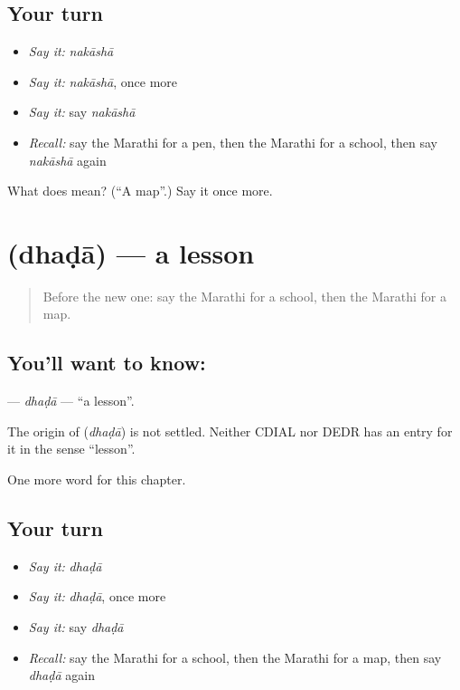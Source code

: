 \subsection*{Your turn}
\begin{itemize}
\raggedright
  \item \emph{Say it:} \emph{nakāshā}
  \item \emph{Say it:} \emph{nakāshā}, once more
  \item \emph{Say it:} say \emph{nakāshā}
  \item \emph{Recall:} say the Marathi for a pen, then the Marathi for a school, then say \emph{nakāshā} again
\end{itemize}

\begin{tcolorbox}[breakable,colback=teal!4,colframe=teal!35!black,title={Before you move on}]
What does  mean? (\textquotedblleft{}A map\textquotedblright{}.) Say it once more.
\end{tcolorbox}
\section[\texorpdfstring{\mr{धडा} (dhaḍā)}{धडा (dhaḍā)}]{ (dhaḍā) — a lesson}

\label{lesson:MR-C94-dhada}



\begin{quote}
Before the new one: say the Marathi for a school, then the Marathi for a map.
\end{quote}

\subsection*{You'll want to know: }
\textbf{} — \emph{dhaḍā} — \textquotedblleft{}a lesson\textquotedblright{}.

\begin{cousinweb}
The origin of \textbf{} (\emph{dhaḍā}) is not settled. Neither CDIAL nor DEDR has an entry for it in the sense \textquotedblleft{}lesson\textquotedblright{}.
\end{cousinweb}

\begin{grammarlens}[title={What you've built}]
One more word for this chapter.
\end{grammarlens}

\subsection*{Your turn}
\begin{itemize}
\raggedright
  \item \emph{Say it:} \emph{dhaḍā}
  \item \emph{Say it:} \emph{dhaḍā}, once more
  \item \emph{Say it:} say \emph{dhaḍā}
  \item \emph{Recall:} say the Marathi for a school, then the Marathi for a map, then say \emph{dhaḍā} again
\end{itemize}

